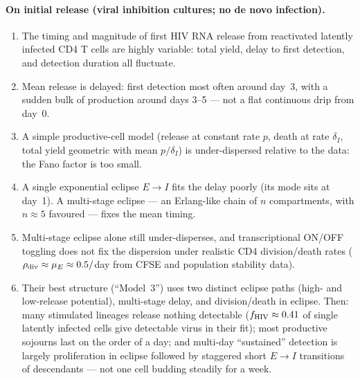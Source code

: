 \paragraph{On initial release (viral inhibition cultures; no de novo
infection).}
\begin{enumerate}
\item The timing and magnitude of first HIV RNA release from reactivated
latently infected CD4 T cells are highly variable: total yield, delay to
first detection, and detection duration all fluctuate.
\item Mean release is delayed: first detection most often around day~3,
with a sudden bulk of production around days 3--5 --- not a flat continuous
drip from day~0.
\item A simple productive-cell model (release at constant rate $p$, death
at rate $\delta_{I}$, total yield geometric with mean $p/\delta_{I}$) is
under-dispersed relative to the data: the Fano factor is too small.
\item A single exponential eclipse $E\to I$ fits the delay poorly (its mode
sits at day~1). A multi-stage eclipse --- an Erlang-like chain of $n$
compartments, with $n\approx5$ favoured --- fixes the mean timing.
\item Multi-stage eclipse alone still under-disperses, and transcriptional
ON/OFF toggling does not fix the dispersion under realistic CD4
division/death rates ($\rho_{\rm div}\approx\mu_E\approx0.5/$day from CFSE
and population stability data).
\item Their best structure (``Model~3'') uses two distinct eclipse paths
(high- and low-release potential), multi-stage delay, and division/death in
eclipse. Then: many stimulated lineages release nothing detectable
($f_{\rm HIV}\approx0.41$ of single latently infected cells give detectable
virus in their fit); most productive sojourns last on the order of a day;
and multi-day ``sustained'' detection is largely proliferation in eclipse
followed by staggered short $E\to I$ transitions of descendants --- not one
cell budding steadily for a week.
\end{enumerate}

